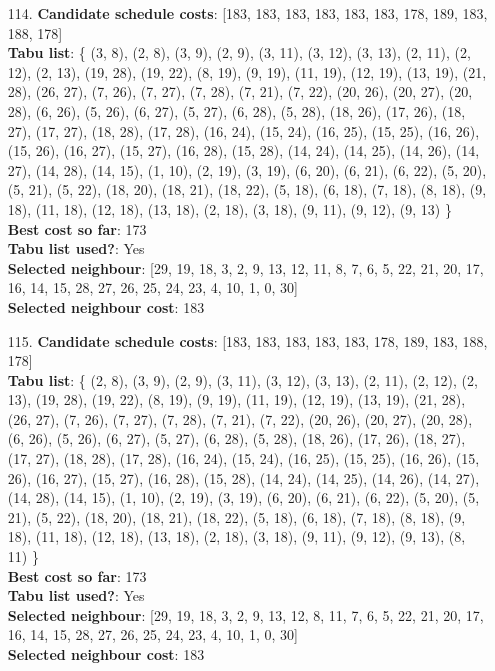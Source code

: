 \documentclass[fleqn]{article}
\begin{document}
\begin{itemize}
    \item[114.] \textbf{Candidate schedule costs}: [183, 183, 183, 183, 183, 183, 178, 189, 183, 188, 178] \\
    \textbf{Tabu list}: \{ (3, 8), (2, 8), (3, 9), (2, 9), (3, 11), (3, 12), (3, 13), (2, 11), (2, 12), (2, 13), (19, 28), (19, 22), (8, 19), (9, 19), (11, 19), (12, 19), (13, 19), (21, 28), (26, 27), (7, 26), (7, 27), (7, 28), (7, 21), (7, 22), (20, 26), (20, 27), (20, 28), (6, 26), (5, 26), (6, 27), (5, 27), (6, 28), (5, 28), (18, 26), (17, 26), (18, 27), (17, 27), (18, 28), (17, 28), (16, 24), (15, 24), (16, 25), (15, 25), (16, 26), (15, 26), (16, 27), (15, 27), (16, 28), (15, 28), (14, 24), (14, 25), (14, 26), (14, 27), (14, 28), (14, 15), (1, 10), (2, 19), (3, 19), (6, 20), (6, 21), (6, 22), (5, 20), (5, 21), (5, 22), (18, 20), (18, 21), (18, 22), (5, 18), (6, 18), (7, 18), (8, 18), (9, 18), (11, 18), (12, 18), (13, 18), (2, 18), (3, 18), (9, 11), (9, 12), (9, 13) \} \\
    \textbf{Best cost so far}: 173 \\
    \textbf{Tabu list used?}: Yes \\
    \textbf{Selected neighbour}: [29, 19, 18, 3, 2, 9, 13, 12, 11, 8, 7, 6, 5, 22, 21, 20, 17, 16, 14, 15, 28, 27, 26, 25, 24, 23, 4, 10, 1, 0, 30] \\
    \textbf{Selected neighbour cost}: 183
      

    \item[115.] \textbf{Candidate schedule costs}: [183, 183, 183, 183, 183, 178, 189, 183, 188, 178] \\
    \textbf{Tabu list}: \{ (2, 8), (3, 9), (2, 9), (3, 11), (3, 12), (3, 13), (2, 11), (2, 12), (2, 13), (19, 28), (19, 22), (8, 19), (9, 19), (11, 19), (12, 19), (13, 19), (21, 28), (26, 27), (7, 26), (7, 27), (7, 28), (7, 21), (7, 22), (20, 26), (20, 27), (20, 28), (6, 26), (5, 26), (6, 27), (5, 27), (6, 28), (5, 28), (18, 26), (17, 26), (18, 27), (17, 27), (18, 28), (17, 28), (16, 24), (15, 24), (16, 25), (15, 25), (16, 26), (15, 26), (16, 27), (15, 27), (16, 28), (15, 28), (14, 24), (14, 25), (14, 26), (14, 27), (14, 28), (14, 15), (1, 10), (2, 19), (3, 19), (6, 20), (6, 21), (6, 22), (5, 20), (5, 21), (5, 22), (18, 20), (18, 21), (18, 22), (5, 18), (6, 18), (7, 18), (8, 18), (9, 18), (11, 18), (12, 18), (13, 18), (2, 18), (3, 18), (9, 11), (9, 12), (9, 13), (8, 11) \} \\
    \textbf{Best cost so far}: 173 \\
    \textbf{Tabu list used?}: Yes \\
    \textbf{Selected neighbour}: [29, 19, 18, 3, 2, 9, 13, 12, 8, 11, 7, 6, 5, 22, 21, 20, 17, 16, 14, 15, 28, 27, 26, 25, 24, 23, 4, 10, 1, 0, 30] \\
    \textbf{Selected neighbour cost}: 183
      


\end{itemize}
\end{document}
